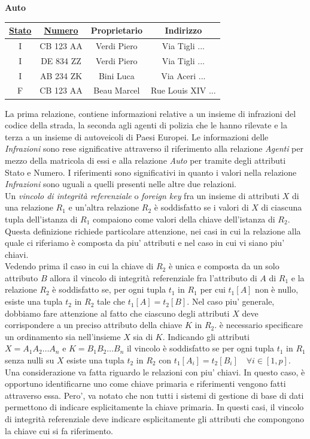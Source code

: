 \documentclass[12pt]{report}
\begin{document}
 	\begin{center}
 		\textbf{Auto}

 		\vspace{0.3cm}

 		\begin{tabular}{|c|c|c|c|}
 			\hline
 			\textbf{\underline{Stato}} & \textbf{\underline{Numero}} & \textbf{Proprietario} & \textbf{Indirizzo} \\
 			\hline
 			I & CB 123 AA & Verdi Piero & Via Tigli ... \\
 			I & DE 834 ZZ & Verdi Piero & Via Tigli ... \\
 			I & AB 234 ZK & Bini Luca & Via Aceri ... \\
 			F & CB 123 AA & Beau Marcel & Rue Louis XIV ... \\
 			\hline
 		\end{tabular}
 	\end{center}
 	La prima relazione, contiene informazioni relative a un insieme di infrazioni del codice della strada, la seconda agli agenti di polizia che le hanno rilevate e la terza a un insieme di autoveicoli di Paesi Europei. Le informazioni delle \textit{Infrazioni} sono rese significative attraverso il riferimento alla relazione \textit{Agenti} per mezzo della matricola di essi e alla relazione \textit{Auto} per tramite degli attributi Stato e Numero. I riferimenti sono significativi in quanto i valori nella relazione \textit{Infrazioni} sono uguali a quelli presenti nelle altre due relazioni. \\
 	Un \textit{vincolo di integrità referenziale} o \textit{foreign key} fra un insieme di attributi $X$ di una relazione $R_1$ e un'altra relazione $R_2$ è soddisfatto se i valori di $X$ di ciascuna tupla dell'istanza di $R_1$ compaiono come valori della chiave dell'istanza di $R_2$. Questa definizione richiede particolare attenzione, nei casi in cui la relazione alla quale ci riferiamo è composta da piu' attributi e nel caso in cui vi siano piu' chiavi. \\
 	Vedendo prima il caso in cui la chiave di $R_2$ è unica e composta da un solo attributo $B$ allora il vincolo di integrità referenziale fra l'attributo di $A$ di $R_1$ e la relazione $R_2$ è soddisfatto se, per ogni tupla $t_1$ in $R_1$ per cui $t_1[A]$ non è nullo, esiste una tupla $t_2$ in $R_2$ tale che $t_1[A] = t_2[B]$. Nel caso piu' generale, dobbiamo fare attenzione al fatto che ciascuno degli attributi $X$ deve corrispondere a un preciso attributo della chiave $K$ in $R_2$. è necessario specificare un ordinamento sia nell'insieme $X$ sia di $K$. Indicando gli attributi $X = A_1A_2\dots A_n$ e $K = B_1B_2\dots B_n$ il vincolo è soddisfatto se per ogni tupla $t_1$ in $R_1$ senza nulli su $X$ esiste una tupla $t_2$ in $R_2$ con $t_1[A_i]=t_2[B_i] \quad \forall i \in [1, p]$. \\
 	Una considerazione va fatta riguardo le relazioni con piu' chiavi. In questo caso, è opportuno identificarne uno come chiave primaria e riferimenti vengono fatti attraverso essa. Pero', va notato che non tutti i sistemi di gestione di base di dati permettono di indicare esplicitamente la chiave primaria. In questi casi, il vincolo di integrità referenziale deve indicare esplicitamente gli attributi che compongono la chiave cui si fa riferimento.
\end{document}

